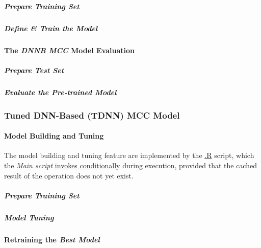\documentclass[
]{report}
\begin{document}
\subparagraph{\texorpdfstring{Prepare \emph{Training Set}}{Prepare Training Set}}\label{dnnb.train_set.tuning}

\hfill\break

\subparagraph{Define \& Train the Model}\label{dnnb.train}

\hfill\break

\paragraph{\texorpdfstring{The \emph{DNNB MCC} Model Evaluation}{The DNNB MCC Model Evaluation}}\label{dnnb.evaluation}

\hfill\break

\subparagraph{\texorpdfstring{Prepare \emph{Test Set}}{Prepare Test Set}}\label{dnnb.eval.test_set}

\hfill\break

\subparagraph{Evaluate the Pre-trained Model}\label{dnnb.best.eval}

\hfill\break

\newpage

\subsubsection{Tuned DNN-Based (TDNN) MCC Model}\label{tuned-dnn-based-tdnn-mcc-model}

\paragraph{Model Building and Tuning}\label{tdnn.build}

\hfill\break

The model building and tuning feature are implemented by the \href{}{.R} script, which the \emph{Main script} \href{https://github.com/AzKurban-edX-DS/edx.capstone.choose-your-own/blob/main/r/index.R\#L}{invokes conditionally} during execution, provided that the cached result of the operation does not yet exist.

\subparagraph{\texorpdfstring{Prepare \emph{Training Set}}{Prepare Training Set}}\label{tdnn.train_set.tuning}

\hfill\break

\subparagraph{Model Tuning}\label{tdnn.tuning}

\hfill\break

\paragraph{\texorpdfstring{Retraining the \emph{Best Model}}{Retraining the Best Model}}\label{tdnn.retraining_best}
\end{document}

